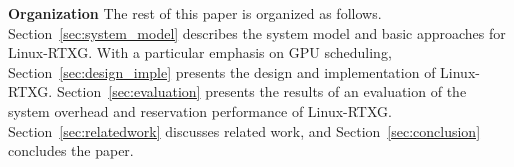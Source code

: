 \textbf{Organization} The rest of this paper is organized as follows. Section~\ref{sec:system_model} describes the system model and basic approaches for Linux-RTXG. With a particular emphasis on GPU scheduling, Section~\ref{sec:design_imple} presents the design and implementation of Linux-RTXG. Section~\ref{sec:evaluation} presents the results of an evaluation of the system overhead and reservation performance of Linux-RTXG. Section~\ref{sec:relatedwork} discusses related work, and Section~\ref{sec:conclusion} concludes the paper. 

